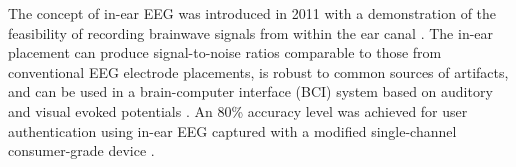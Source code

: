 \documentclass{sigchi}
\begin{document}


The concept of in-ear EEG was introduced in 2011 with a demonstration of the feasibility of recording brainwave signals from within the ear canal \cite{Looney2011}. The in-ear placement can produce signal-to-noise ratios comparable to those from conventional EEG electrode placements, is robust to common sources of artifacts, and can be used in a brain-computer interface (BCI) system based on auditory and visual evoked potentials \cite{Kidmose2013a}. An 80\% accuracy level was achieved for user authentication using in-ear EEG captured with a modified single-channel consumer-grade device \cite{curran2016passthoughts}.

\end{document}
